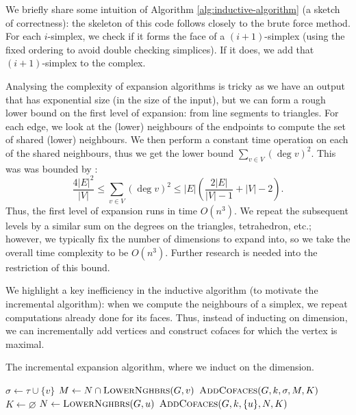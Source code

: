 We briefly share some intuition of Algorithm \ref{alg:inductive-algorithm} (a sketch of correctness): the skeleton of this code follows closely to the brute force method. For each $i$-simplex, we check if it forms the face of a $(i+1)$-simplex (using the fixed ordering to avoid double checking simplices). If it does, we add that $(i+1)$-simplex to the complex.

Analysing the complexity of expansion algorithms is tricky as we have an output that has exponential size (in the size of the input), but we can form a rough lower bound on the first level of expansion: from line segments to triangles. For each edge, we look at the (lower) neighbours of the endpoints to compute the set of shared (lower) neighbours. We then perform a constant time operation on each of the shared neighbours, thus we get the lower bound $\sum_{v \in V} \left(\deg v\right)^2$. This was was bounded by \textcite{de1998upper}:
\[
    \frac{4\lvert E \rvert^2}{\lvert V \rvert} \leq \sum_{v \in V} \left(\deg v\right)^2 \leq \lvert E \rvert \left(
    \frac{2\lvert E \rvert}{\lvert V \rvert - 1} + \lvert V \rvert - 2
    \right).
\]
Thus, the first level of expansion runs in time $O(n^3)$. We repeat the subsequent levels by a similar sum on the degrees on the triangles, tetrahedron, etc.; however, we typically fix the number of dimensions to expand into, so we take the overall time complexity to be $O(n^3)$. Further research is needed into the restriction of this bound.

We highlight a key inefficiency in the inductive algorithm (to motivate the incremental algorithm): when we compute the neighbours of a simplex, we repeat computations already done for its faces. Thus, instead of inducting on dimension, we can incrementally add vertices and construct cofaces for which the vertex is maximal. 

\begin{algorithm}
    \caption{The incremental expansion algorithm, where we induct on the dimension.}
    \label{alg:incremental-algorithm}
    \begin{algorithmic}
        \State \Return
        \EndIf
        \State $\sigma \gets \tau \cup \{v\}$
        \State $M \gets N \cap \textsc{LowerNghbrs}(G, v)$
        \State $\textsc{AddCofaces}(G, k, \sigma, M, K)$
        \EndFor
        \EndFunction
        \State $K \gets \varnothing$
        \State $N \gets \textsc{LowerNghbrs}(G, u)$
        \State $\textsc{AddCofaces}(G, k, \{u\}, N, K)$
        \EndFor
        \EndFunction
    \end{algorithmic}
\end{algorithm}

